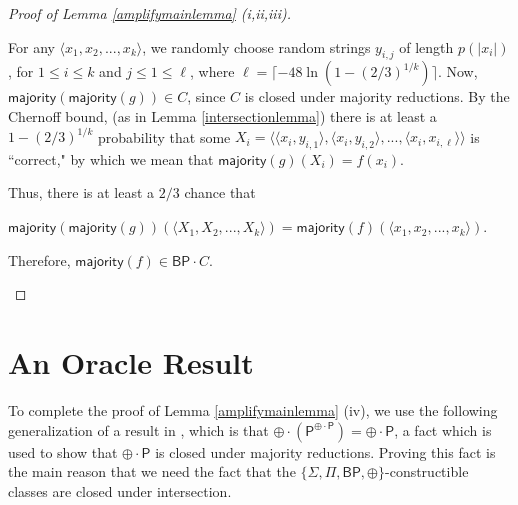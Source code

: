 \documentclass[11pt]{article}
\newcommand{\pr}{\text{Pr}}
\newcommand{\bp}{\textsf{BP}}
\newcommand{\parity}{\oplus}
\newcommand{\p}{\textsf{P}}
\newcommand{\majority}{\textsf{majority}}
\begin{document}
\begin{proof}[Proof of Lemma \ref{amplifymainlemma} (i,ii,iii)]
\begin{enumerate}
For any $\langle x_1,x_2,...,x_k\rangle$, we randomly choose random strings $y_{i,j}$ of length $p(|x_i|)$, for $1\le i\le k$ and $j\le 1\le \ell$, where $\ell = \lceil -48\ln(1 - (2/3)^{1/k}) \rceil$.
Now, $\majority(\majority(g)) \in C$, since $C$ is closed under majority reductions. By the Chernoff bound, (as in Lemma \ref{intersectionlemma}) there is at least a $1-(2/3)^{1/k}$ probability that some $X_i = \langle\langle x_i,y_{i,1}\rangle, \langle x_i, y_{i,2}\rangle,...,\langle x_i, x_{i,\ell}\rangle\rangle$ is ``correct," by which we mean that $\majority(g)(X_i) = f(x_i)$.

Thus, there is at least a $2/3$ chance that \begin{center}$\majority(\majority(g))(\langle X_1,X_2,...,X_k\rangle) = \majority(f)(\langle x_1,x_2,...,x_k\rangle)$.\end{center} Therefore, $\majority(f) \in \bp \cdot C$.
\end{enumerate}
\end{proof}

\section{An Oracle Result}\label{oracle}

To complete the proof of Lemma \ref{amplifymainlemma} (iv), we use the following generalization of a result in \cite{Toda}, which is that $\parity \cdot (\p ^{\parity\cdot\p}) = \parity\cdot\p$, a fact which is used to show that $\parity \cdot \p$ is closed under majority reductions. Proving this fact is the main reason that we need the fact that the $\{\Sigma, \Pi, \bp, \parity\}$-constructible classes are closed under intersection.
\end{document}
